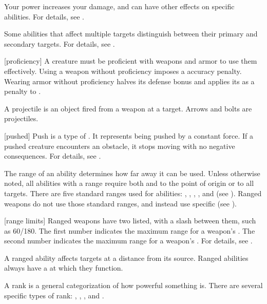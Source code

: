  Your power increases your damage, and can have other effects on specific abilities.
For details, see .

 Some abilities that affect multiple targets distinguish between their primary and secondary targets.
For details, see .

[proficiency] A creature must be proficient with weapons and armor to use them effectively.
Using a weapon without proficiency imposes a  accuracy penalty.
Wearing armor without proficiency halves its defense bonus and applies its  as a penalty to .

 A projectile is an object fired from a weapon at a target.
Arrows and bolts are projectiles.

[pushed] Push is a type of .
It represents being pushed by a constant force.
If a pushed creature encounters an obstacle, it stops moving with no negative consequences.
For details, see .

 The range of an ability determines how far away it can be used.
Unless otherwise noted, all abilities with a range require both  and  to the point of origin or to all targets.
There are five standard ranges used for abilities: \shortrange, \medrange, \longrange, \distrange, and \extrange (see ).
Ranged weapons do not use those standard ranges, and instead use specific  (see ).

[range limits] Ranged weapons have two  listed, with a slash between them, such as 60/180.
The first number indicates the maximum range for a weapon's .
The second number indicates the maximum range for a weapon's .
For details, see .

 A ranged ability affects targets at a distance from its source.
Ranged abilities always have a  at which they function.

 A rank is a general categorization of how powerful something is.
There are several specific types of rank: , , , and .

